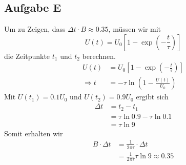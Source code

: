 \documentclass[10pt]{article}
\begin{document}
\begin{multicols}{2}
	\subsection{Aufgabe E}
	Um zu Zeigen, dass \(\Delta t \cdot B \approx 0.35\), müssen wir mit \[U(t)=U_0 \left[1 - \exp{(-\frac{t}{\tau})}\right]\] die Zeitpunkte \(t_1\) und \(t_2\) berechnen.
	\begin{align}
		U(t)          & = U_0\left[1-\exp{(-\frac{t}{\tau})}\right]\\
		\Rightarrow t & =-\tau\ln{\left(1-\frac{U(t)}{U_0}\right)}
	\end{align}
Mit \(U(t_1)=0.1U_0\) und \(U(t_2) = 0.9U_0\) ergibt sich
\begin{align}
  \Delta t &= t_2 - t_1 \\
           &= \tau\ln{0.9} - \tau\ln{0.1}\\
           &= \tau\ln{9}
\end{align}
Somit erhalten wir
\begin{align}
  B\cdot\Delta t &= \frac{1}{2\pi\tau} \cdot \Delta t\\
  &= \frac{1}{2\pi\tau}\tau\ln{9}\approx 0.35
\end{align}

\end{multicols}
\end{document}
